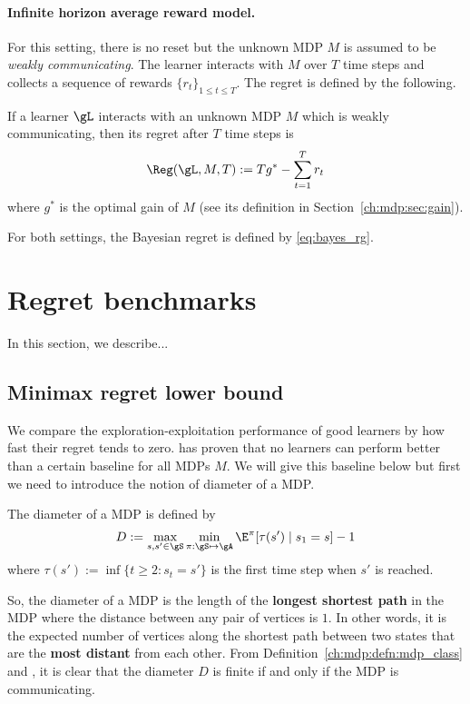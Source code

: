 \paragraph{Infinite horizon average reward model.}
For this setting, there is no reset but the unknown MDP $M$ is assumed to be \emph{weakly communicating}.
The learner interacts with $M$ over $T$ time steps and collects a sequence of rewards $\{r_t\}_{1\le t\le T}$.
The regret is defined by the following.
\begin{defn}
    \label{defn:rg_infinite}
    If a learner $\gL$ interacts with an unknown MDP $M$ which is weakly communicating, then its regret after $T$ time steps is
    \begin{equation}
        \label{eq:rg_finite}
        \Reg(\gL, M, T):= Tg^* -\sum_{t=1}^Tr_t
    \end{equation}
    where $g^*$ is the optimal gain of $M$ (see its definition in Section~\ref{ch:mdp:sec:gain}).
\end{defn}

For both settings, the Bayesian regret is defined by \eqref{eq:bayes_rg}.

\section{Regret benchmarks}
\label{sec:rg_benchmark}

In this section, we describe... 

\subsection{Minimax regret lower bound}

We compare the exploration-exploitation performance of good learners by how fast their regret tends to zero.
\cite{jaksch2010near} has proven that no learners can perform better than a certain baseline for all MDPs $M$.
We will give this baseline below but first we need to introduce the notion of diameter of a MDP.
\begin{defn}
    The diameter of a MDP is defined by
    \begin{equation}
        \label{eq:diameter}
        D := \max_{s,s'\in\gS}\min_{\pi:\gS\mapsto\gA} \E^\pi[\tau(s') \mid s_1=s] -1
    \end{equation}
    where $\tau(s'):=\inf\{t\ge2 : s_t=s'\}$ is the first time step when $s'$ is reached.
\end{defn}
So, the diameter of a MDP is the length of the \textbf{longest shortest path} in the MDP where the distance between any pair of vertices is $1$.
In other words, it is the expected number of vertices along the shortest path between two states that are the \textbf{most distant} from each other.
From Definition~\ref{ch:mdp:defn:mdp_class} and \cite[Proposition~8.3.1]{puterman2014markov}, it is clear that the diameter $D$ is finite if and only if the MDP is communicating.

